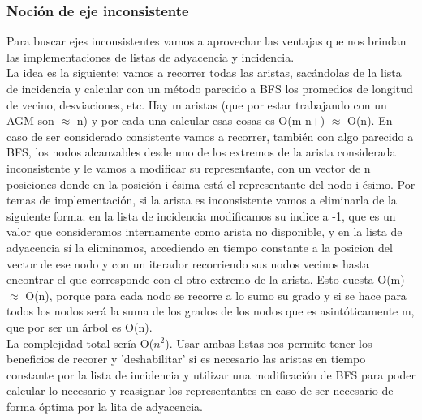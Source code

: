 \documentclass[11pt,a4paper]{article}
\begin{document}
\subsubsection{Noción de eje inconsistente}
Para buscar ejes inconsistentes vamos a aprovechar las ventajas que nos brindan las implementaciones de listas de adyacencia y incidencia. \\
La idea es la siguiente: vamos a recorrer todas las aristas, sacándolas de la lista de incidencia y calcular con un método parecido a BFS los promedios de longitud de vecino, desviaciones, etc. Hay m aristas (que por estar trabajando con un AGM son $\approx$ n) y por cada una calcular esas cosas es O(m n+) $\approx$ O(n). En caso de ser considerado consistente vamos a recorrer, también con algo parecido a BFS, los nodos alcanzables desde uno de los extremos de la arista considerada inconsistente y le vamos a modificar su representante, con un vector de n posiciones donde en la posición i-ésima está el representante del nodo i-ésimo. Por temas de implementación, si la arista es inconsistente vamos a eliminarla de la siguiente forma: en la lista de incidencia modificamos su indice a -1, que es un valor que consideramos internamente como arista no disponible, y en la lista de adyacencia sí la eliminamos, accediendo en tiempo constante a la posicion del vector de ese nodo y con un iterador recorriendo sus nodos vecinos hasta encontrar el que corresponde con el otro extremo de la arista. Esto cuesta O(m) $\approx$ O(n), porque para cada nodo se recorre a lo sumo su grado y si se hace para todos los nodos será la suma de los grados de los nodos que es asintóticamente m, que por ser un árbol es O(n).\\
La complejidad total sería O($n^{2}$). Usar ambas listas nos permite tener los beneficios de recorer y 'deshabilitar' si es necesario las aristas en tiempo constante por la lista de incidencia y utilizar una modificación de BFS para poder calcular lo necesario y reasignar los representantes en caso de ser necesario de forma óptima por la lita de adyacencia.
\end{document}
